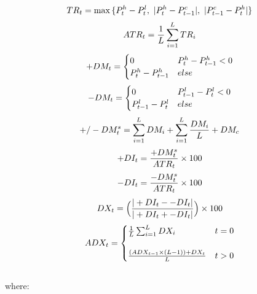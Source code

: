 \documentclass{article}
\begin{document}
\begin{equation}
    TR_{t} = \max{\{P_{t}^{h}-P_{t}^{l},\ |P_{t}^{h} - P_{t-1}^{c}|, \
    |P_{t-1}^{c} - P_{t}^{h}|}\}
\end{equation}
\begin{equation}
    ATR_{t} = \frac{1}{L} \sum_{i=1}^{L} TR_{i}
\end{equation}
\begin{equation}
    +DM_{t} = \begin{cases}
    0 & P_{t}^{h}-P_{t-1}^{h} < 0 \\
    P_{t}^{h}-P_{t-1}^{h} & else
    \end{cases}
\end{equation}
\begin{equation}
    -DM_{t} = \begin{cases}
    0 & P_{t-1}^{l}-P_{t}^{l} < 0 \\
    P_{t-1}^{l}-P_{t}^{l} & else
    \end{cases}
\end{equation}
\begin{equation}
    +/-DM_{t}^{s} = \sum_{i=1}^{L} DM_{i} + \sum_{i=1}^{L} \frac{DM_{i}}{L} + DM_{c}
\end{equation}
\begin{equation}
    +DI_{t} = \frac{+DM_{t}^{s}}{ATR_{t}} \times 100
\end{equation}
\begin{equation}
    -DI_{t} = \frac{-DM_{t}^{s}}{ATR_{t}} \times 100
\end{equation}
\begin{equation}
    DX_{t} = \Big( \frac{|+DI_{t} - -DI_{t}|}{|+DI_{t} + -DI_{t}|}\Big) \times 100
\end{equation}
\begin{equation}
ADX_{t} =
    \begin{cases}
        \frac{1}{L} \sum_{i=1}^{L} DX_{i} & t = 0 \\ \\
        \frac{(ADX_{t-1} \times (L -1)) + DX_{t}}{L} & t > 0
    \end{cases}
\end{equation}
\\ %
where:
\end{document}
